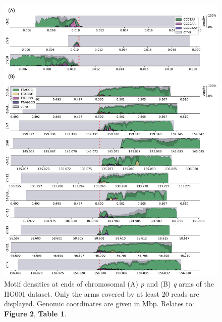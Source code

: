 \documentclass{article}
\begin{document}
\begin{figure}[ht!] \centering
\includegraphics[height=.95\textheight,width=\textwidth,keepaspectratio]{figures/threemotifp/HG001-densityplots-threemotifp.pdf}
\caption{
    Motif densities at ends of chromosomal (A) \textit{p} and (B) \textit{q} arms of the HG001 dataset.
    Only the arms covered by at least 20 reads are displayed.
    Genomic coordinates are given in Mbp.
    Relates to: \textbf{Figure 2}, \textbf{Table 1}.
}
\label{fig:hg001_densityplots}
\end{figure}
\clearpage \pagebreak
\end{document}
